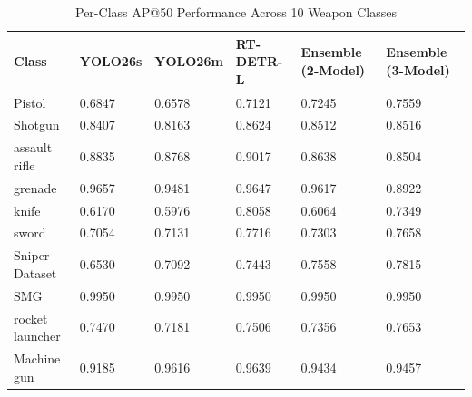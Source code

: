 \begin{table}
\caption{Per-Class AP@50 Performance Across 10 Weapon Classes}
\label{tab:per_class}
\begin{tabular}{llllll}
\toprule
Class & YOLO26s & YOLO26m & RT-DETR-L & Ensemble (2-Model) & Ensemble (3-Model) \\
\midrule
Pistol & 0.6847 & 0.6578 & 0.7121 & 0.7245 & 0.7559 \\
Shotgun & 0.8407 & 0.8163 & 0.8624 & 0.8512 & 0.8516 \\
assault rifle & 0.8835 & 0.8768 & 0.9017 & 0.8638 & 0.8504 \\
grenade & 0.9657 & 0.9481 & 0.9647 & 0.9617 & 0.8922 \\
knife & 0.6170 & 0.5976 & 0.8058 & 0.6064 & 0.7349 \\
sword & 0.7054 & 0.7131 & 0.7716 & 0.7303 & 0.7658 \\
Sniper Dataset & 0.6530 & 0.7092 & 0.7443 & 0.7558 & 0.7815 \\
SMG & 0.9950 & 0.9950 & 0.9950 & 0.9950 & 0.9950 \\
rocket launcher & 0.7470 & 0.7181 & 0.7506 & 0.7356 & 0.7653 \\
Machine gun & 0.9185 & 0.9616 & 0.9639 & 0.9434 & 0.9457 \\
\bottomrule
\end{tabular}
\end{table}
